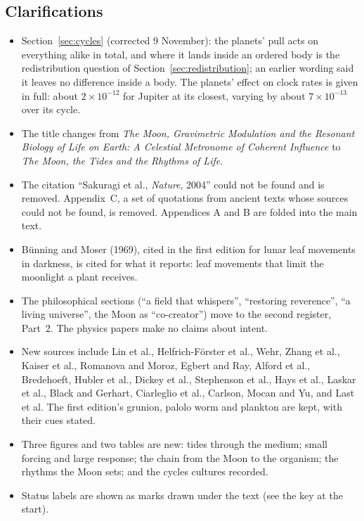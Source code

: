 \documentclass[11pt,a4paper]{article}
\begin{document}
\subsection*{Clarifications}
\begin{itemize}
\item Section~\ref{sec:cycles} (corrected 9 November): the planets' pull acts on everything alike in total, and where it lands inside an ordered body is the redistribution question of Section~\ref{sec:redistribution}; an earlier wording said it leaves no difference inside a body. The planets' effect on clock rates is given in full: about $2\times10^{-12}$ for Jupiter at its closest, varying by about $7\times10^{-13}$ over its cycle.
  \item The title changes from \emph{The Moon, Gravimetric Modulation and the Resonant Biology of Life on Earth: A Celestial Metronome of Coherent Influence} to \emph{The Moon, the Tides and the Rhythms of Life}.
  \item The citation ``Sakuragi et al., \emph{Nature}, 2004'' could not be found and is removed. Appendix~C, a set of quotations from ancient texts whose sources could not be found, is removed. Appendices A and B are folded into the main text.
  \item Bünning and Moser (1969), cited in the first edition for lunar leaf movements in darkness, is cited for what it reports: leaf movements that limit the moonlight a plant receives.
  \item The philosophical sections (``a field that whispers'', ``restoring reverence'', ``a living universe'', the Moon as ``co-creator'') move to the second register, Part~2. The physics papers make no claims about intent.
  \item New sources include Lin et al., Helfrich-F\"orster et al., Wehr, Zhang et al., Kaiser et al., Romanova and Moroz, Egbert and Ray, Alford et al., Bredehoeft, Hubler et al., Dickey et al., Stephenson et al., Hays et al., Laskar et al., Black and Gerhart, Ciarleglio et al., Carlson, Mocan and Yu, and Last et al. The first edition's grunion, palolo worm and plankton are kept, with their cues stated.
  \item Three figures and two tables are new: tides through the medium; small forcing and large response; the chain from the Moon to the organism; the rhythms the Moon sets; and the cycles cultures recorded.
  \item Status labels are shown as marks drawn under the text (see the key at the start).
\end{itemize}

\newpage


\end{document}
